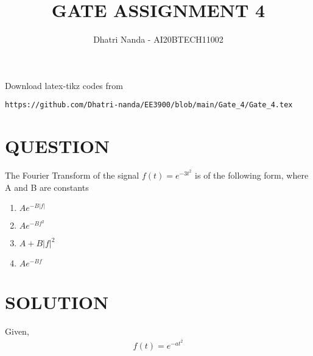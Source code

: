 \documentclass[journal,12pt,twocolumn]{IEEEtran}
\begin{document}
\let\vec\mathbf
\renewcommand{\thefigure}{\theproblem}
\def\putbox#1#2#3{\makebox[0in][l]{\makebox[#1][l]{}\raisebox{\baselineskip}[0in][0in]{\raisebox{#2}[0in][0in]{#3}}}}
     \def\rightbox#1{\makebox[0in][r]{#1}}
     \def\centbox#1{\makebox[0in]{#1}}
     \def\topbox#1{\raisebox{-\baselineskip}[0in][0in]{#1}}
     \def\midbox#1{\raisebox{-0.5\baselineskip}[0in][0in]{#1}}
\vspace{3cm}
\title{\textbf{ GATE ASSIGNMENT 4}}
\author{Dhatri Nanda - AI20BTECH11002}
\maketitle
\newpage
\bigskip
\renewcommand{\thefigure}{\arabic{figure}}
\renewcommand{\thetable}{\arabic{table}}
Download latex-tikz codes from 
%
\begin{lstlisting}
https://github.com/Dhatri-nanda/EE3900/blob/main/Gate_4/Gate_4.tex
\end{lstlisting}
\section*{QUESTION}
The Fourier Transform of the signal $f(t) = e^{-3t^2}$ is of the following form, where A and B are constants

\begin{enumerate}[label={\Alph*)}]
\item $Ae^{-B|f|}$\\
\item $Ae^{-Bf^2}$\\
\item $A + B|f|^2$\\
\item $Ae^{-Bf}$\\
\end{enumerate}

\section*{SOLUTION}
        Given, 
        \begin{align}
            f(t) = e^{-at^2} \label{eq 1}
        \end{align}
        
\end{document}
